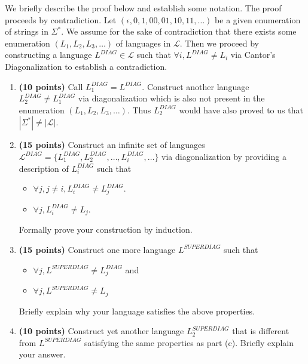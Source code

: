 \documentclass[12pt]{article}
\theoremstyle{definition}
\numberwithin{equation}{section}
\begin{document}
\begin{enumerate}
  We briefly describe the proof below and establish some notation. The proof
  proceeds by contradiction. Let $(\epsilon, 0, 1, 00, 01, 10, 11, \ldots)$ be
  a given enumeration of strings in $\Sigma^*$. We assume for the sake of
  contradiction that there exists some enumeration $(L_1, L_2, L_3, \ldots)$
  of languages in $\mathcal{L}$. Then we proceed by constructing a language
  $L^{DIAG} \in \mathcal{L}$ such that $\forall i, L^{DIAG} \not = L_i$ via
  Cantor's Diagonalization to establish a contradiction.
  \begin{enumerate}
    \item \textbf{(10 points)} Call $L_1^{DIAG} = L^{DIAG}$. Construct another language
    $L_2^{DIAG} \not = L_1^{DIAG}$ via diagonalization which is also not
    present in the enumeration $(L_1, L_2, L_3, \ldots)$. Thus $L_2^{DIAG}$
    would have also proved to us that $|\Sigma^*| \not = |\mathcal{L}|$.
    \item \textbf{(15 points)} Construct an infinite set of languages $\mathcal{L}^{DIAG}
     = \{L_1^{DIAG}, L_2^{DIAG}, \ldots, L_i^{DIAG}, \ldots \}$ via
     diagonalization by providing a description of $L_i^{DIAG}$ such that
     \begin{itemize}
       \item $ \forall j, j \not = i, L_i^{DIAG} \not = L_j^{DIAG} $.
       \item $ \forall j, L_i^{DIAG} \not = L_j$.
       \end{itemize}
       Formally prove your construction by induction.
     \item \textbf{(15 points)} Construct one more language
     $L^{SUPERDIAG}$ such that
     \begin{itemize}
       \item $ \forall j, L^{SUPERDIAG} \not = L^{DIAG}_j$ and
     \item $ \forall j, L^{SUPERDIAG} \not = L_j$
     \end{itemize}
     Briefly explain why your language satisfies the above properties.
     \item \textbf{(10 points)} Construct yet another language $L^{SUPERDIAG}_2$ that is different
     from $L^{SUPERDIAG}$ satisfying the same properties as part (c). Briefly
     explain your answer.
  \end{enumerate}

\end{enumerate}
\end{document}
